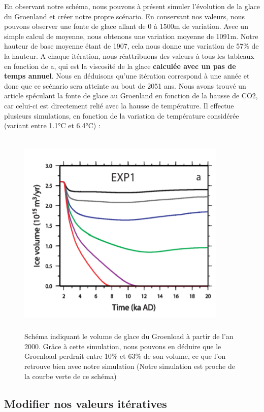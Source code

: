 \documentclass{article}
\begin{document}
En observant notre schéma, nous pouvons à présent simuler l'évolution de la glace du Groenland et créer notre propre scénario. En conservant nos valeurs, nous pouvons observer une fonte de glace allant de 0 à 1500m de variation. Avec un simple calcul de moyenne, nous obtenons une variation moyenne de 1091m. Notre hauteur de base moyenne étant de 1907, cela nous donne une variation de 57\% de la hauteur. A chaque itération, nous réattribuons des valeurs à tous les tableaux en fonction de a, qui est la viscosité de la glace \textbf{calculée avec un pas de temps annuel}. Nous en déduisons qu'une itération correspond à une année et donc que ce scénario sera atteinte au bout de 2051 ans. 
\newpage
Nous avons trouvé un article \cite{charbit2008amount} spéculant la fonte de glace au Groenland en fonction de la hausse de CO2, car celui-ci est directement relié avec la hausse de température. Il effectue plusieurs simulations, en fonction de la variation de température considérée (variant entre 1.1°C et 6.4°C) : 
\begin{figure}[!htpb]
\centering
\includegraphics[width=10cm, keepaspectratio=true, height=10cm]{Variation.png}
\caption{Schéma indiquant le volume de glace du Groenload à partir de l'an 2000. Grâce à cette simulation, nous pouvons en déduire que le Groenload perdrait entre 10\% et 63\% de son volume, ce que l'on retrouve bien avec notre simulation (Notre simulation est proche de la courbe verte de ce schéma) }
\end{figure}
\newpage
\subsection{Modifier nos valeurs itératives}
\end{document}
